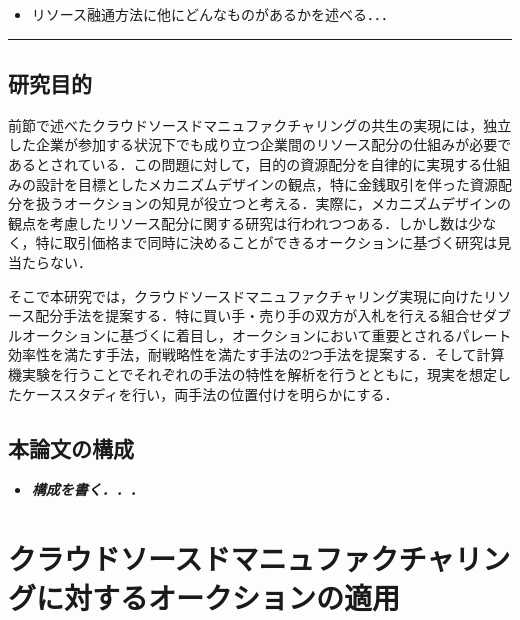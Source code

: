 \begin{itemize}
\tightlist
\item
  リソース融通方法に他にどんなものがあるかを述べる．．．
\end{itemize}

\begin{center}\rule{1.0\linewidth}{0.5pt}\end{center}

\hypertarget{ux7814ux7a76ux76eeux7684}{%
\section{研究目的}\label{ux7814ux7a76ux76eeux7684}}

前節で述べたクラウドソースドマニュファクチャリングの共生の実現には，独立した企業が参加する状況下でも成り立つ企業間のリソース配分の仕組みが必要であるとされている\cite{Ghomi2019}．この問題に対して，目的の資源配分を自律的に実現する仕組みの設計を目標としたメカニズムデザインの観点，特に金銭取引を伴った資源配分を扱うオークションの知見が役立つと考える．実際に，メカニズムデザインの観点を考慮したリソース配分に関する研究は行われつつある\cite{THEKINEN2017}\cite{CHIDA2019}．しかし数は少なく，特に取引価格まで同時に決めることができるオークションに基づく研究は見当たらない．

そこで本研究では，クラウドソースドマニュファクチャリング実現に向けたリソース配分手法を提案する．特に買い手・売り手の双方が入札を行える組合せダブルオークションに基づくに着目し，オークションにおいて重要とされるパレート効率性を満たす手法，耐戦略性を満たす手法の2つ手法を提案する．そして計算機実験を行うことでそれぞれの手法の特性を解析を行うとともに，現実を想定したケーススタディを行い，両手法の位置付けを明らかにする．

\hypertarget{ux672cux8ad6ux6587ux306eux69cbux6210}{%
\section{本論文の構成}\label{ux672cux8ad6ux6587ux306eux69cbux6210}}

\begin{itemize}
\tightlist
\item
  \textbf{\emph{構成を書く．．．}}
\end{itemize}

\hypertarget{ux30afux30e9ux30a6ux30c9ux30bdux30fcux30b9ux30c9ux30deux30cbux30e5ux30d5ux30a1ux30afux30c1ux30e3ux30eaux30f3ux30b0ux306bux5bfeux3059ux308bux30aaux30fcux30afux30b7ux30e7ux30f3ux306eux9069ux7528}{%
\chapter{クラウドソースドマニュファクチャリングに対するオークションの適用}\label{ux30afux30e9ux30a6ux30c9ux30bdux30fcux30b9ux30c9ux30deux30cbux30e5ux30d5ux30a1ux30afux30c1ux30e3ux30eaux30f3ux30b0ux306bux5bfeux3059ux308bux30aaux30fcux30afux30b7ux30e7ux30f3ux306eux9069ux7528}}


